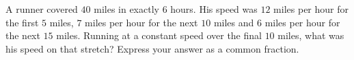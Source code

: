 A runner covered $40$ miles in exactly $6$ hours. His speed was $12$ miles per hour for the first $5$ miles, $7$ miles per hour for the next $10$ miles and $6$ miles per hour for the next $15$ miles. Running at a constant speed over the final $10$ miles, what was his speed on that stretch? Express your answer as a common fraction.
